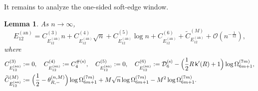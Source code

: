 \documentclass[a4paper]{article}
\newtheorem{lemma}[theorem]{Lemma}
\numberwithin{equation}{section}
\begin{document}
It remains to analyze the one-sided soft-edge window.

\begin{lemma}\label{lemma:asymptotic expansion E12 annulus}
\label{lemma:asymptotics of E12 counting annulus}
As $n\to\infty$,
\[
    E_{12}^{(\mathrm{an})}
    =
    C_{E_{12}^{(\mathrm{an})}}^{(3)}n
    +
    C_{E_{12}^{(\mathrm{an})}}^{(4)}\sqrt{n}
    +
    C_{E_{12}^{(\mathrm{an})}}^{(5)}\log n
    +
    C_{E_{12}^{(\mathrm{an})}}^{(6)}
    +
    \widetilde{C}_{E_{12}^{(\mathrm{an})}}^{(M)}
    +
    \mathcal{O}(n^{-\frac{1}{12}}),
\]  
where 
\begin{align*}
C_{E_{12}^{(\mathrm{an})}}^{(3)}
&:=0, \quad
C_{E_{12}^{(\mathrm{an})}}^{(4)}
:=C_4^{\#(\mathrm{s})},
\quad
C_{E_{12}^{(\mathrm{an})}}^{(5)}
:=0, 
\quad
C_{E_{12}^{(\mathrm{an})}}^{(6)}
:=
\mathcal{D}_6^{(\mathrm{s})}
-\Bigl(\frac{1}{2}R\,\mathsf{k}'(R)+1\Bigr)\log\Omega_{6m+1}^{(7m)},
\\
\widetilde{C}_{E_{12}^{(\mathrm{an})}}^{(M)}
&:=
\Bigl(\frac{1}{2}-\theta_{R,-}^{(n,M)}\Bigr)\log\Omega_{6m+1}^{(7m)}
+M\sqrt{n}\log\Omega_{6m+1}^{(7m)}
-M^2\log\Omega_{6m+1}^{(7m)}.
\end{align*}
\end{lemma}
\end{document}
